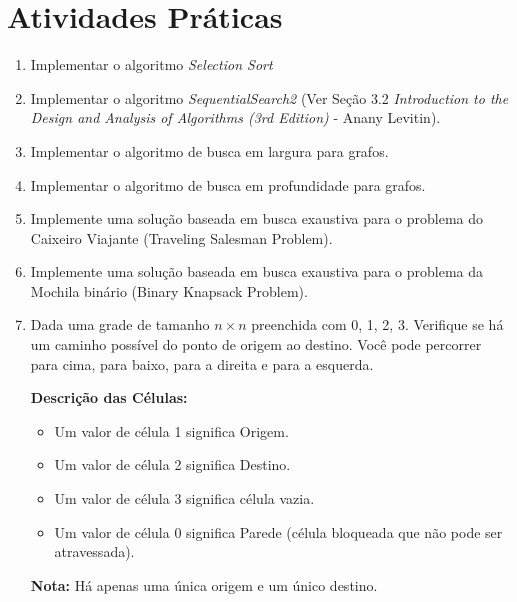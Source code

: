 \documentclass{article}
\begin{document}
\section{Atividades Práticas}

\begin{enumerate}
    \item Implementar o algoritmo \textit{Selection Sort}
    \item Implementar o algoritmo \textit{SequentialSearch2} (Ver Seção 3.2  \textit{Introduction to the Design and Analysis of Algorithms (3rd Edition)} - Anany Levitin).
    \item Implementar o algoritmo de busca em largura para grafos.
    \item Implementar o algoritmo de busca em profundidade para grafos.
    \item Implemente uma solução baseada em busca exaustiva para o problema do Caixeiro Viajante (Traveling Salesman Problem). 
    \item Implemente uma solução baseada em busca exaustiva para o problema da Mochila binário (Binary Knapsack Problem).
    \item Dada uma grade de tamanho \( n \times n \) preenchida com 0, 1, 2, 3. Verifique se há um caminho possível do ponto de origem ao destino. Você pode percorrer para cima, para baixo, para a direita e para a esquerda. 

    \textbf{Descrição das Células:}
    \begin{itemize}
        \item Um valor de célula 1 significa Origem.
        \item Um valor de célula 2 significa Destino.
        \item Um valor de célula 3 significa célula vazia.
        \item Um valor de célula 0 significa Parede (célula bloqueada que não pode ser atravessada).
    \end{itemize}
    
    \textbf{Nota:} Há apenas uma única origem e um único destino.
    

\end{enumerate}
\end{document}
